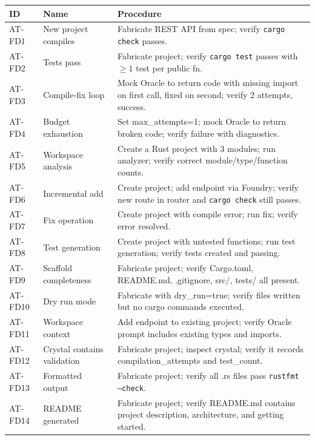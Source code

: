 \documentclass[11pt,a4paper,twoside]{article}
\theoremstyle{definition}
\theoremstyle{plain}
\theoremstyle{remark}
\begin{document}
\begin{longtable}{l l p{5.5cm}}
\toprule
\textbf{ID} & \textbf{Name} & \textbf{Procedure} \\
\midrule
\endfirsthead \midrule \endhead \bottomrule \endfoot
AT-FD1 & New project compiles & Fabricate REST API from spec; verify
  \texttt{cargo check} passes. \\
AT-FD2 & Tests pass & Fabricate project; verify \texttt{cargo test}
  passes with $\ge 1$ test per public fn. \\
AT-FD3 & Compile-fix loop & Mock Oracle to return code with missing
  import on first call, fixed on second; verify 2 attempts,
  success. \\
AT-FD4 & Budget exhaustion & Set max\_attempts=1; mock Oracle to
  return broken code; verify failure with diagnostics. \\
AT-FD5 & Workspace analysis & Create a Rust project with 3 modules;
  run analyzer; verify correct module/type/function counts. \\
AT-FD6 & Incremental add & Create project; add endpoint via Foundry;
  verify new route in router and \texttt{cargo check} still passes. \\
AT-FD7 & Fix operation & Create project with compile error; run
  fix; verify error resolved. \\
AT-FD8 & Test generation & Create project with untested functions;
  run test generation; verify tests created and passing. \\
AT-FD9 & Scaffold completeness & Fabricate project; verify Cargo.toml,
  README.md, .gitignore, src/, tests/ all present. \\
AT-FD10 & Dry run mode & Fabricate with dry\_run=true; verify files
  written but no cargo commands executed. \\
AT-FD11 & Workspace context & Add endpoint to existing project;
  verify Oracle prompt includes existing types and imports. \\
AT-FD12 & Crystal contains validation & Fabricate project; inspect
  crystal; verify it records compilation\_attempts and
  test\_count. \\
AT-FD13 & Formatted output & Fabricate project; verify all .rs files
  pass \texttt{rustfmt --check}. \\
AT-FD14 & README generated & Fabricate project; verify README.md
  contains project description, architecture, and getting started. \\
\end{longtable}
\end{document}

